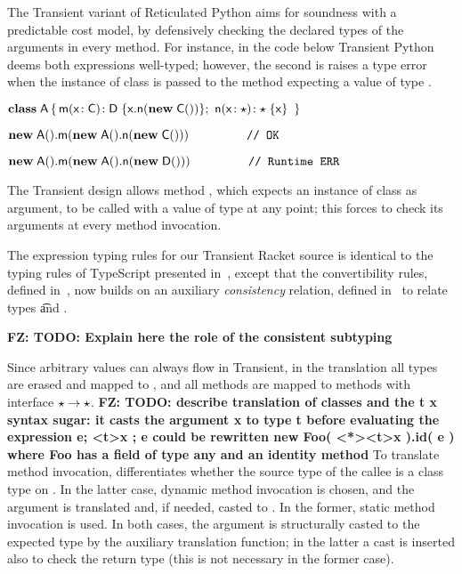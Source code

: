 \documentclass[acmlarge, anonymous, authordraft, review]{acmart} %
\newcommand{\FZ}[1]{\textbf{FZ: #1}}
\begin{document}
The Transient variant of Reticulated Python aims for soundness
with a predictable cost model, by defensively checking the declared types of the arguments in every method.  For instance, in the code below Transient Python deems both expressions well-typed;  however, the
second is raises a type error when the instance of class \D is passed to the method \m
expecting a value of type \C.  

\smallskip
\(\Class \A  { \Mdef \m\x\C \D  {\Call \x\n{\New{\C}{}}}  ; \  \Mdef \n\x\any \any  \x} \)

\smallskip
\(\Call {\New\A{}} \m{\Call {\New \A{}} \n {\New \C{}}} \ \ \ \ \ \ \ \ \ \ \ \ \ \ \texttt{// OK}\)

\(\Call {\New\A{}} \m{\Call {\New \A{}} \n {\New \D{}}} \ \ \ \ \ \ \ \ \ \ \ \ \ \ \texttt{// Runtime ERR}\)
\smallskip

\noindent 
The Transient design allows method \m, which expects an instance of
class \C as argument, to be called with a value of type \any at any point; this forces
\m to check its arguments at every method invocation.   

The expression typing rules for our Transient Racket source is identical to the typing rules of TypeScript presented in~, except that the convertibility rules, defined in~, now builds on an auxiliary \emph{consistency}  relation, defined in~ to relate types \t and \tp.
 
\FZ{TODO: Explain here the role of the consistent subtyping}

Since arbitrary values can always flow in Transient, in the \kafka translation all types are erased and mapped to \any, and all methods are mapped to methods with interface \(\star \to \star\).   \FZ{TODO: describe translation of classes and the t x syntax sugar: it casts the argument x to type t before evaluating the expression e; <t>x ;  e  could be rewritten  new Foo( <*><t>x ).id( e )  where Foo has a field of type any and an identity method } To translate method invocation, \kafka differentiates whether the source type of the callee is a class type \C on \any.  In the latter case, dynamic method invocation is chosen, and the argument is translated and, if needed, casted to \any.  In the former, static method invocation is used.  In both cases, the argument is structurally casted to the expected type by the auxiliary translation function; in the latter a cast is inserted also to check the return type (this is not necessary in the former case).
\end{document}
